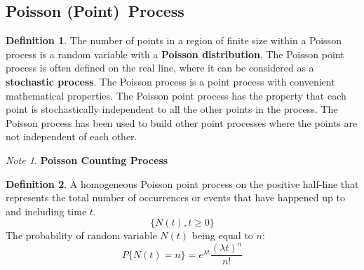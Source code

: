 \documentclass[12pt]{article}
\theoremstyle{plain}
\theoremstyle{definition}
\newtheorem{definition}{Definition}
\theoremstyle{remark}
\newtheorem*{note}{Note}
\begin{document}
\subsection[Poisson Process]{Poisson (Point)\footnotemark\ Process}


\begin{definition}
  The number of points in a region of finite size within a Poisson process is
  a random variable with a \textbf{Poisson distribution}.
  The Poisson point process is often defined on the real line, where it can be
  considered as a \textbf{stochastic process}.
  The Poisson process is a point process with convenient mathematical
  properties.
  The Poisson point process has the property that each point is stochastically
  independent to all the other points in the process.
  The Poisson process has been used to build other point processes where the
  points are not independent of each other.
\end{definition}

\begin{note}

  \textbf{Poisson Counting Process}

\begin{definition}
  A homogeneous Poisson point process on the positive half-line that represents
  the total number of occurrences or events that have happened up to and
  including time $t$.
  \begin{equation*}
    \{ N(t), t \geq 0 \}
  \end{equation*}
  The probability of random variable $N(t)$ being equal to $n$:
  \begin{equation*}
    P\{N(t)=n\} = e^{\lambda t} \frac{(\lambda t)^n}{n!}
  \end{equation*}
\end{definition}

\end{note}
\end{document}
